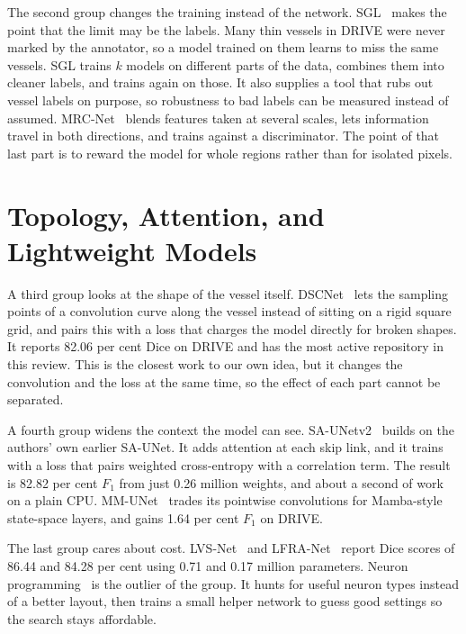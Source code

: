 \documentclass[conference]{IEEEtran}
\begin{document}
The second group changes the training instead of the network.
SGL~\cite{sgl} makes the point that the limit may be the labels. Many thin
vessels in DRIVE were never marked by the annotator, so a model trained on them
learns to miss the same vessels. SGL trains $k$ models on different parts of
the data, combines them into cleaner labels, and trains again on those. It also
supplies a tool that rubs out vessel labels on purpose, so robustness to bad
labels can be measured instead of assumed. MRC-Net~\cite{mrcnet} blends
features taken at several scales, lets information travel in both directions,
and trains against a discriminator. The point of that last part is to reward
the model for whole regions rather than for isolated pixels.

\section{Topology, Attention, and Lightweight Models}

A third group looks at the shape of the vessel itself. DSCNet~\cite{dscnet}
lets the sampling points of a convolution curve along the vessel instead of
sitting on a rigid square grid, and pairs this with a loss that charges the
model directly for broken shapes. It reports 82.06 per cent Dice on DRIVE and
has the most active repository in this review. This is the closest work to our
own idea, but it changes the convolution and the loss at the same time, so the
effect of each part cannot be separated.

A fourth group widens the context the model can see.
SA-UNetv2~\cite{saunetv2} builds on the authors' own earlier SA-UNet. It adds
attention at each skip link, and it trains with a loss that pairs weighted
cross-entropy with a correlation term. The result is 82.82 per cent $F_1$ from
just 0.26 million weights, and about a second of work on a plain CPU.
MM-UNet~\cite{mmunet} trades its pointwise convolutions for Mamba-style
state-space layers, and gains 1.64 per cent $F_1$ on DRIVE.

The last group cares about cost. LVS-Net~\cite{lvsnet} and
LFRA-Net~\cite{lfranet} report Dice scores of 86.44 and 84.28 per cent using
0.71 and 0.17 million parameters. Neuron programming~\cite{neuronprog} is the
outlier of the group. It hunts for useful neuron types instead of a better
layout, then trains a small helper network to guess good settings so the search
stays affordable.
\end{document}
